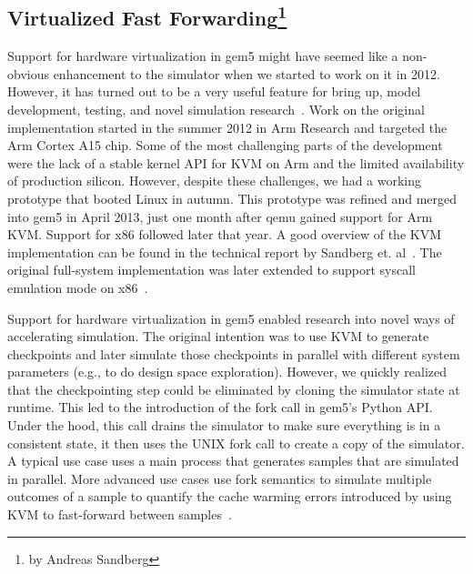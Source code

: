 \subsection[Virtualized Fast Forwarding]{Virtualized Fast Forwarding\footnote{by Andreas Sandberg}}
\label{sec:virtualized-ff}

Support for hardware virtualization in gem5 might have seemed like a non-obvious enhancement to the simulator when we started to work on it in 2012.
However, it has turned out to be a very useful feature for bring up, model development, testing, and novel simulation research~\cite{full-speed-ahead, NikolerisSHC16, NikolerisEHC19}.
Work on the original implementation started in the summer 2012 in Arm Research and targeted the Arm Cortex A15 chip. Some of the most challenging parts of the development were the lack of a stable kernel API for KVM on Arm and the limited availability of production silicon.
However, despite these challenges, we had a working prototype that booted Linux in autumn.
This prototype was refined and merged into gem5 in April 2013, just one month after qemu gained support for Arm KVM.
Support for x86 followed later that year.
A good overview of the KVM implementation can be found in the technical report by Sandberg et. al~\cite{full-speed-ahead}.
The original full-system implementation was later extended to support syscall emulation mode on x86~\cite{DutuSlice2015-kvm}.

Support for hardware virtualization in gem5 enabled research into novel ways of accelerating simulation.
The original intention was to use KVM to generate checkpoints and later simulate those checkpoints in parallel with different system parameters (e.g., to do design space exploration).
However, we quickly realized that the checkpointing step could be eliminated by cloning the simulator state at runtime.
This led to the introduction of the fork call in gem5's Python API.
Under the hood, this call drains the simulator to make sure everything is in a consistent state, it then uses the UNIX fork call to create a copy of the simulator.
A typical use case uses a main process that generates samples that are simulated in parallel.
More advanced use cases use fork semantics to simulate multiple outcomes of a sample to quantify the cache warming errors introduced by using KVM to fast-forward between samples~\cite{full-speed-ahead}.
